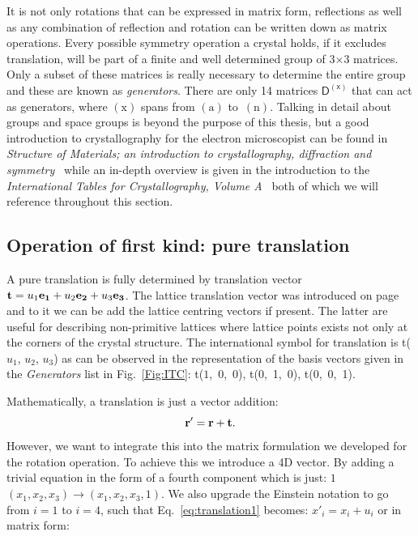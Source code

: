 \vspace{0.5cm}


It is not only rotations that can be expressed in matrix form, reflections as well as any combination of reflection and rotation can be written down as matrix operations. Every possible symmetry operation a crystal holds, if it excludes translation, will be part of a finite and well determined group of 3$\times$3 matrices. Only a subset of these matrices is really necessary to determine the entire group and these are known as \textit{generators}. There are only 14 matrices $\mathsf{D^{(x)}}$ that can act as generators, where $\mathrm{(x)}$ spans from $\mathrm{(a)}$ to~$\mathrm{(n)}$. Talking in detail about groups and space groups is beyond the purpose of this thesis, but a good introduction to crystallography for the electron microscopist can be found in \textit{Structure of Materials; an introduction to crystallography, diffraction and symmetry}~\cite{SoM} while an in-depth overview is given in the introduction to the \textit{ International Tables for Crystallography, Volume A}~\cite{IntTableCrysA} both of which we will reference throughout this section.

\subsection{Operation of first kind: pure translation}
A pure translation is fully determined by translation vector $\vb{t}=u_1\vb{e_1} + u_2\vb{e_2} + u_3\vb{e_3}$. The lattice translation vector was introduced on page~\pageref{Sect:spaceLattice} and to it we can be add the lattice centring vectors if present. The latter are useful for describing non-primitive lattices where lattice points exists not only at the corners of the crystal structure. The international symbol for translation is t($u_1$, $u_2$, $u_3$) as can be observed in the representation of the basis vectors given in the \textit{Generators} list in Fig.~\ref{Fig:ITC}: t($1$,~$0$,~$0$), t(0,~1,~0), t(0,~0,~1).

Mathematically, a translation is just a vector addition:
\begin{equation}
\vb{r'} = \vb{r} + \vb{t}.
\label{eq:translation1}
\end{equation}
However, we want to integrate this into the matrix formulation we developed for the rotation operation. To achieve this we introduce a 4D vector. By adding a trivial equation in the form of a fourth component which is just: $1$ $(x_1, x_2, x_3) \rightarrow (x_1, x_2, x_3, 1)$. We also upgrade the Einstein notation to go from $i=1$ to $i=4$, such that Eq.~\ref{eq:translation1} becomes: $x'_i =x_i + u_i$ or in matrix form:

